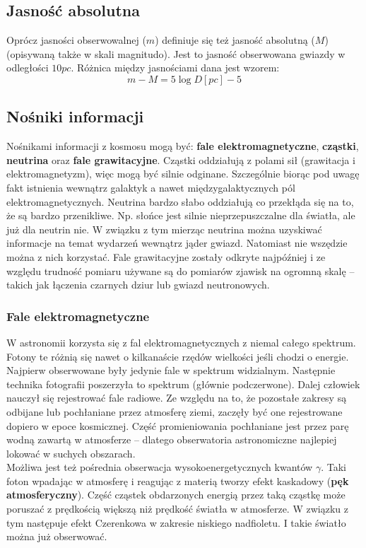 \documentclass[../index.tex]{subfiles}
\begin{document}
        \subsection{Jasność absolutna}
            Oprócz jasności obserwowalnej (\(m\)) definiuje się też jasność absolutną (\(M\)) (opisywaną także w skali magnitudo). Jest to jasność obserwowana gwiazdy w odległości \(10 pc\). Różnica między jasnościami dana jest wzorem:
            \begin{equation}
                m - M = 5 \log D[pc] - 5 \label{eq:absolute_magnitudo}
            \end{equation}
        \subsection{Nośniki informacji}
            Nośnikami informacji z kosmosu mogą być: \textbf{fale elektromagnetyczne}, \textbf{cząstki}, \textbf{neutrina} oraz \textbf{fale grawitacyjne}. Cząstki oddziałują z polami sił (grawitacja i elektromagnetyzm), więc mogą być silnie odginane. Szczególnie biorąc pod uwagę fakt istnienia wewnątrz galaktyk a nawet międzygalaktycznych pól elektromagnetycznych. Neutrina bardzo słabo oddziałują co przekłąda się na to, że są bardzo przenikliwe. Np. słońce jest silnie nieprzepuszczalne dla światła, ale już dla neutrin nie. W związku z tym mierząc neutrina można uzyskiwać informacje na temat wydarzeń wewnątrz jąder gwiazd. Natomiast nie wszędzie można z nich korzystać. Fale grawitacyjne zostały odkryte najpóźniej i ze względu trudność pomiaru używane są do pomiarów zjawisk na ogromną skalę \--- takich jak łączenia czarnych dziur lub gwiazd neutronowych.
            \subsubsection{Fale elektromagnetyczne}
                W astronomii korzysta się z fal elektromagnetycznych z niemal całego spektrum. Fotony te różnią się nawet o kilkanaście rzędów wielkości jeśli chodzi o energie. Najpierw obserwowane były jedynie fale w spektrum widzialnym. Następnie technika fotografii poszerzyła to spektrum (głównie podczerwone). Dalej człowiek nauczył się rejestrować fale radiowe. Ze względu na to, że pozostałe zakresy są odbijane lub pochłaniane przez atmosferę ziemi, zaczęły być one rejestrowane dopiero w epoce kosmicznej. Część promieniowania pochłaniane jest przez parę wodną zawartą w atmosferze \--- dlatego obserwatoria astronomiczne najlepiej lokować w suchych obszarach.\\
                Możliwa jest też pośrednia obserwacja wysokoenergetycznych kwantów \(\gamma\). Taki foton wpadając w atmosferę i reagując z materią tworzy efekt kaskadowy (\textbf{pęk atmosferyczny}). Część cząstek obdarzonych energią przez taką cząstkę może poruszać z prędkością większą niż prędkość światła w atmosferze. W związku z tym następuje efekt Czerenkowa w zakresie niskiego nadfioletu. I takie światło można już obserwować.
\end{document}
